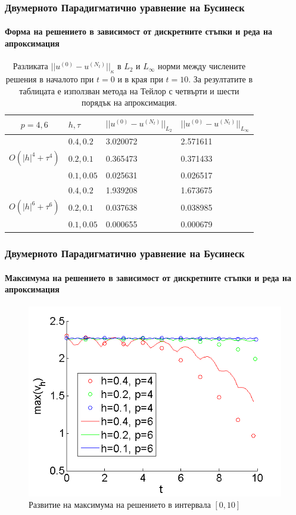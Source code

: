 \documentclass{beamer}
\begin{document}
\begin{frame}
\frametitle{Двумерното Парадигматично уравнение на Бусинеск}
\framesubtitle{Форма на решението в зависимост от дискретните стъпки и реда на апроксимация}

\begin{table}[ht]
\centering
\small
		\begin{tabular}{||c|l|l|l||}
			\hline
			\hline
  $p=4,6$   &  $h, \tau$ &  $||u^{(0)} - u^{(N_t)}||_{L_2}$  & $||u^{(0)} - u^{(N_t)}||_{L_\infty}$   \\
   		      \hline 
			\hline
           				& $0.4, 0.2$   &  3.020072 & 2.571611     \\
			\hline 
  $O(|h|^4+\tau^4)$ & $0.2, 0.1$   & 0.365473 & 0.371433      \\
			\hline 
           				& $0.1, 0.05$ & 0.025631 & 0.026517      \\
	   \hline
          \hline
           				& $0.4, 0.2$   & 1.939208 & 1.673675      \\
			\hline
  $O(|h|^6+\tau^6)$ & $0.2, 0.1$   & 0.037638 & 0.038985      \\
    \hline
           				& $0.1, 0.05$  & 0.000655 & 0.000679       \\
	   \hline
		\hline 
		\end{tabular}
		\caption{Разликата $||u^{(0)} - u^{(N_t)}||_\kappa$ в $L_2$ и $L_\infty$ норми между числените решения в началото при $t=0$ и в края при $t=10$. За резултатите в таблицата е използван метода на Тейлор с четвърти и шести порядък на апроксимация. }
\label{tableK}
\end{table}

\end{frame}

\begin{frame}
\frametitle{Двумерното Парадигматично уравнение на Бусинеск}
\framesubtitle{Максимума на решението в зависимост от дискретните стъпки и реда на апроксимация}
\begin{figure}
	\includegraphics[width=0.65\linewidth]{../thesis/Maximum_TaylorZeroBnd_50x50_bt3_c030.png}
\caption{Развитие на максимума на решението в интервала $[0, 10]$}

\end{figure}

\end{frame}
\end{document}
